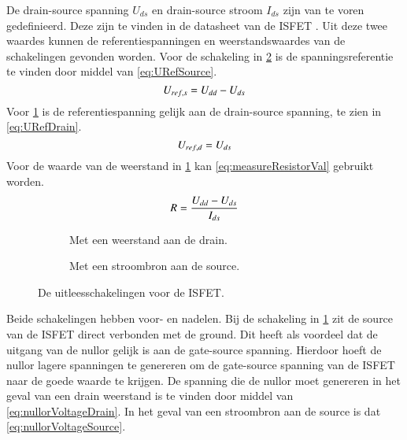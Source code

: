 De drain-source spanning $U_{ds}$ en drain-source stroom $I_{ds}$ zijn van te voren gedefinieerd. Deze zijn te vinden in de datasheet van de ISFET \cite{isfet}. Uit deze twee waardes kunnen de referentiespanningen en weerstandswaardes van de schakelingen gevonden worden.
Voor de schakeling in \cref{fig:measureCurrent} is de spanningsreferentie te vinden door middel van \cref{eq:URefSource}.
\begin{equation}\label{eq:URefSource}
    U_{ref,s} = U_{dd} - U_{ds}
    \tagaddtext{[\si{\volt}]}
\end{equation}
Voor \cref{fig:measureResistor} is de referentiespanning gelijk aan de drain-source spanning, te zien in \cref{eq:URefDrain}.
\begin{equation}\label{eq:URefDrain}
    U_{ref,d} = U_{ds}
    \tagaddtext{[\si{\volt}]}
\end{equation}
Voor de waarde van de weerstand in \cref{fig:measureResistor} kan \cref{eq:measureResistorVal} gebruikt worden.
\begin{equation}\label{eq:measureResistorVal}
    R = \frac{U_{dd} - U_{ds}}{I_{ds}}
    \tagaddtext{[\si{\ohm}]}
\end{equation}


\begin{figure}[!htb]
    \centering
    \begin{subfigure}[b]{0.45\textwidth}
        \centering
        \def\svgwidth{\textwidth}
        
        \caption{Met een weerstand aan de drain.}
        \label{fig:measureResistor}
    \end{subfigure}
    \hfill
    \begin{subfigure}[b]{0.45\textwidth}
        \centering
        \def\svgwidth{\textwidth}
        
        \caption{Met een stroombron aan de source.}
        \label{fig:measureCurrent}
    \end{subfigure}
    \caption{De uitleesschakelingen voor de ISFET.}
    \label{fig:measureCircuits}
\end{figure}

Beide schakelingen hebben voor- en nadelen.
Bij de schakeling in \cref{fig:measureResistor} zit de source van de ISFET direct verbonden met de ground. Dit heeft als voordeel dat de uitgang van de nullor gelijk is aan de gate-source spanning. Hierdoor hoeft de nullor lagere spanningen te genereren om de gate-source spanning van de ISFET naar de goede waarde te krijgen. De spanning die de nullor moet genereren in het geval van een drain weerstand is te vinden door middel van \cref{eq:nullorVoltageDrain}. In het geval van een stroombron aan de source is dat \cref{eq:nullorVoltageSource}.


